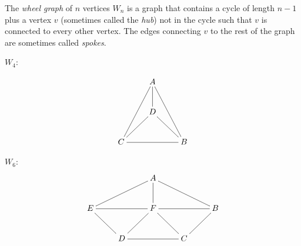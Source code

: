 \documentclass{article}
\begin{document}
The \emph{wheel graph} of $n$ vertices $W_n$ is a graph that contains a cycle of length $n-1$ plus a vertex $v$ (sometimes called the \emph{hub}) not in the cycle such that $v$ is connected to every other vertex.  The edges connecting $v$ to the rest of the graph are sometimes called \emph{spokes}.

$W_4$:

$$\xymatrix{
  & A \ar@{-}[d] \ar@{-}[ddl] \ar@{-}[ddr] & \\
  & D & \\
C \ar@{-}[ur] \ar@{-}[rr] &   & B \ar@{-}[ul]
}$$

$W_6$:
$$\xymatrix{
  &   & A \ar@{-}[d] \ar@{-}[drr] &   &   \\
E\ar@{-}[rr] \ar@{-}[urr] &   & F &   & B \ar@{-}[ll] \ar@{-}[dl] \\
  & D \ar@{-}[ur] \ar@{-}[ul] &   & C \ar@{-}[ul] \ar@{-}[ll]&   \\
}$$
\end{document}
